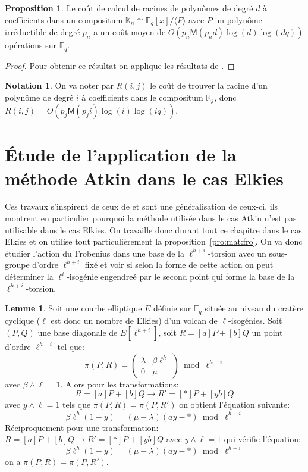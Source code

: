 \documentclass[10pt,a4paper]{book}
\theoremstyle{plain}
\theoremstyle{definition}
\newtheorem{lem}[thm]{Lemme}
\theoremstyle{definition}
\theoremstyle{definition}
\newtheorem{prop}[thm]{Proposition}
\theoremstyle{definition}
\theoremstyle{remark}
\theoremstyle{remark}
\theoremstyle{definition}
\newtheorem{nota}[thm]{Notation}
\begin{document}
\begin{prop}
\label{pro:rac:com}
 Le coût de calcul de racines de polynômes de degré $d$ à coefficients dans un 
 compositum $\mathbb{K}_{n} \cong \mathbb{F}_q[x]/ \langle P \rangle$
 avec $P$ un polynôme irréductible de degré $p_n$ a un coût moyen de 
 $O(p_n \mathsf{M}(p_nd)\log(d)\log(dq))$ opérations sur $\mathbb{F}_q$.
\end{prop}
 
\begin{proof}
Pour obtenir ce résultat on applique les résultats de \cite[Chapter 14.5]{vzGJG03}.
\end{proof}

\begin{nota}
On va noter par $R(i,j)$ le coût de trouver la racine d'un polynôme de degré 
$i$ à coefficients dans le compositum $\mathbb{K}_j$, donc 
$R(i,j)=O(p_j \mathsf{M}(p_ji)\log(i)\log(iq))$.
\end{nota}


\section{\'Etude de l'application de la méthode Atkin dans le cas Elkies}
Ces travaux s'inspirent de ceux de \cite[Chapitre 6]{Master13} et sont une 
généralisation de ceux-ci, ils montrent en particulier pourquoi la méthode 
utilisée dans le cas Atkin n'est pas utilisable dans le cas Elkies. On 
travaille donc durant tout ce chapitre dans le cas Elkies et on utilise tout
particulièrement la proposition~\ref{pro:mat:fro}. On va donc étudier l'action
du Frobenius dans une base de la $\ell^{h+i}$-torsion avec un sous-groupe 
d'ordre $\ell^{h+i}$ fixé et voir si selon la forme de cette action on peut 
déterminer la $\ell^{i}$-isogénie engendreé par le second point qui forme la 
base de la $\ell^{h+i}$-torsion.

\begin{lem} \label{lem:app:eq}
Soit une courbe elliptique $E$ définie sur $\mathbb{F}_q$ située au niveau du
cratère cyclique ($\ell$ est donc un nombre de Elkies) d'un volcan de 
$\ell$-isogénies. Soit $(P,Q)$ une base diagonale de $E[\ell^{h+i}]$, soit 
$R=[a]P+[b]Q$ un point d'ordre $\ell^{h+i}$ tel que:
\begin{equation}
  \label{eq:mat}
 \pi(P,R)= \left(\begin{array}{cc}
      \lambda & \beta \ell^{h}\\
      0 & \mu
    \end{array}\right) \bmod \ell^{h+i}
\end{equation}
avec $\beta \wedge \ell =1$. Alors pour les transformations:
\begin{equation*}
R=[a]P+[b]Q \rightarrow R'=[*]P+[yb]Q
\end{equation*}
avec $y\wedge \ell=1$ tels que $\pi(P,R)=\pi(P,R')$ on obtient l'équation 
suivante:
\[  \beta \ell^h (1-y) = (\mu - \lambda) (ay-*)  \bmod \ell^{h+i} \]
Réciproquement pour une transformation:
$R=[a]P+[b]Q \rightarrow R'=[*]P+[yb]Q$ avec $y \wedge \ell =1$ qui vérifie 
l'équation:
\[   \beta \ell^h (1-y) = (\mu - \lambda) (ay-*)  \bmod \ell^{h+i} \]
 on a $\pi(P,R)=\pi(P,R')$.
\end{lem}
\end{document}
